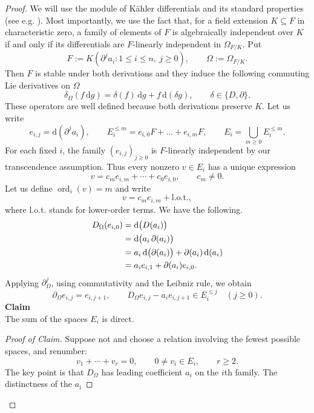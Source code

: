 \documentclass[10pt,a4paper]{amsart}
\newcommand{\ord}{\operatorname{ord}}
\newcommand{\dd}{\mathrm d}
\begin{document}
\begin{proof}
We will use the module of K\"{a}hler differentials and its standard properties (see e.g. \cite{Stacks}). Most importantly, we use the fact that, for a field extension $K\subseteq F$ in characteristic zero, a family of
elements of $F$ is algebraically independent over $K$ if
and only if its differentials are $F$-linearly independent
in $\Omega_{F/K}$. Put
\[
 F:=K(\partial^j a_i:1\leqslant i\leqslant n,\ j\geqslant0),
 \qquad \Omega:=\Omega_{F/K}.
\]
Then $F$ is stable under both
derivations and they induce the following commuting Lie derivatives on $\Omega$
\[
 \delta_\Omega(f\,\dd g)
 =\delta(f)\,\dd g+f\,\dd(\delta g),
 \qquad \delta\in\{D,\partial\}.
\]
These operators are well defined because both derivations preserve $K$. Let us write
\[
 e_{i,j}=\dd(\partial^j a_i),\qquad
 E_i^{\leqslant m}=e_{i,0}F+\ldots+e_{i,m}F,\qquad
 E_i=\bigcup_{m\geqslant0}E_i^{\leqslant m}.
\]
For each fixed $i$, the family $(e_{i,j})_{j\geqslant0}$ is $F$-linearly
independent by our transcendence assumption. Thus every nonzero $v\in E_i$ has a unique expression
\[
 v=c_m e_{i,m}+\cdots+c_0e_{i,0},\qquad c_m\neq0.
\]
Let us define $\ord_i(v)=m$ and write
\[
v=c_me_{i,m}+\text{l.o.t.},
\]
where l.o.t. stands for lower-order terms.
We have the following.
\begin{align}
D_\Omega(e_{i,0})
  &= \dd\bigl(D(a_i)\bigr) \notag\\
  &= \dd\bigl(a_i\,\partial(a_i)\bigr) \notag\\
  &= a_i\,\dd\bigl(\partial(a_i)\bigr)
     + \partial(a_i)\,\dd(a_i) \notag\\
  &= a_i e_{i,1} + \partial(a_i)e_{i,0} \notag.
\end{align}
Applying $\partial_\Omega^j$, using commutativity and the Leibniz rule,
we obtain
\begin{equation}\label{leading}
 \partial_\Omega e_{i,j}=e_{i,j+1},\qquad
 D_\Omega e_{i,j}-a_i e_{i,j+1}\in E_i^{\leqslant j}
 \quad(j\geqslant0).
\end{equation}
{\bf Claim}
\\
The sum of the spaces $E_i$ is direct.
\begin{proof}[Proof of Claim]
Suppose not and choose a
relation involving the fewest possible spaces, and renumber:
\begin{equation}\label{minimal}
 v_1+\cdots+v_r=0,\qquad
 0\neq v_i\in E_i,\qquad r\geqslant2.
\end{equation}
The key point is that $D_\Omega$ has leading coefficient
$a_i$ on the $i$th family. The distinctness of the $a_i$

\end{proof}
\end{proof}
\end{document}
